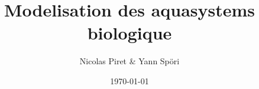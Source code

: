 \documentclass[t,ignorenonframetext]{beamer}
\title{Modelisation des aquasystems biologique}
\author[Yann]{Nicolas Piret \& Yann Sp\"ori}
\date{\today}
\institute[ULB]{Université Libre de Bruxelles}
\begin{document}
\frame{
  \maketitle
}

\end{document}
